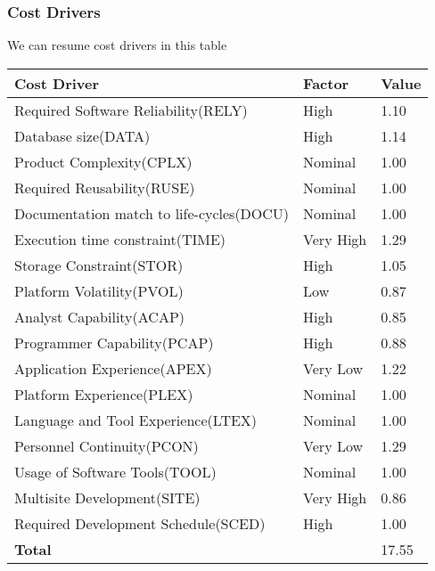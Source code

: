 \subsubsection{Cost Drivers}



















We can resume cost drivers in this table\\
\begin{tabular}{|p{8cm}|p{3cm}|p{2cm}|}
\hline
\textbf{Cost Driver} & \textbf{Factor} & \textbf{Value}\\
\hline
Required Software Reliability(RELY) & High & 1.10\\
Database size(DATA) & High & 1.14\\
Product Complexity(CPLX) & Nominal & 1.00\\
Required Reusability(RUSE) & Nominal & 1.00\\
Documentation match to life-cycles(DOCU) & Nominal & 1.00\\
Execution time constraint(TIME) & Very High & 1.29\\
Storage Constraint(STOR) & High & 1.05\\
Platform Volatility(PVOL) & Low & 0.87\\
Analyst Capability(ACAP) & High & 0.85\\
Programmer Capability(PCAP) & High & 0.88\\
Application Experience(APEX) & Very Low & 1.22\\
Platform Experience(PLEX) & Nominal & 1.00\\
Language and Tool Experience(LTEX) & Nominal & 1.00\\
Personnel Continuity(PCON) & Very Low & 1.29\\
Usage of Software Tools(TOOL) & Nominal & 1.00\\
Multisite Development(SITE) & Very High & 0.86\\
Required Development Schedule(SCED) & High & 1.00\\
\hline
\multicolumn{2}{|l|}{\textbf{Total}} & 17.55\\
\hline
\end{tabular}